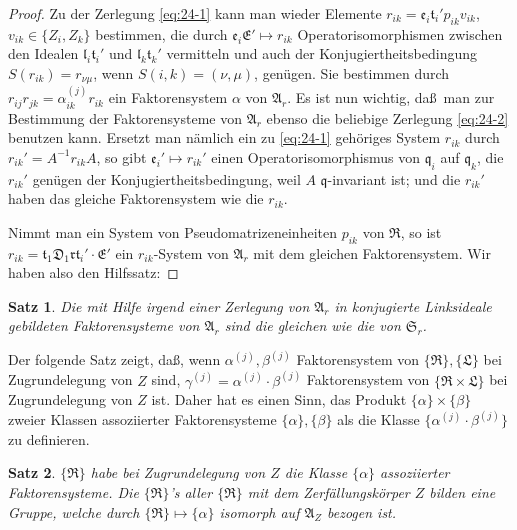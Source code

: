 \documentclass[12pt,a4paper]{article}
\theoremstyle{plain}
\newtheorem{satz}{Satz}[section]
\theoremstyle{definition}
\theoremstyle{remark}
\begin{document}
\begin{proof}
Zu der Zerlegung \eqref{eq:24-1} kann man wieder Elemente
$r_{ik} = \mathfrak{e}_{i}\mathfrak{t}_{i}'p_{ik}v_{ik}$, $v_{ik} \in \{Z_{i}, Z_{k}\}$ bestimmen, die durch
$\mathfrak{e}_{i}\mathfrak{E}' \mapsto r_{ik}$ Operatorisomorphismen zwischen den Idealen
$\mathfrak{l}_{i}\mathfrak{t}_{i}'$ und $\mathfrak{l}_{k}\mathfrak{t}_{k}'$ vermitteln und auch der Konjugiertheitsbedingung
$S(r_{ik}) = r_{\nu\mu}$, wenn $S(i, k) = (\nu, \mu)$, gen\"ugen. Sie bestimmen durch
$r_{ij}r_{jk} = \alpha_{ik}^{(j)}r_{ik}$ ein Faktorensystem $\alpha$ von $\mathfrak{A}_{r}$. Es ist nun
wichtig, da\ss\ man zur Bestimmung der Faktorensysteme von $\mathfrak{A}_{r}$ ebenso die
beliebige Zerlegung \eqref{eq:24-2} benutzen kann. Ersetzt man n\"amlich ein zu
\eqref{eq:24-1} geh\"origes System $r_{ik}$ durch $r_{ik}' = A^{-1}r_{ik}A$, so gibt
$\mathfrak{e}_{i}' \mapsto r_{ik}'$ einen Operatorisomorphismus von $\mathfrak{q}_{i}$ auf $\mathfrak{q}_{k}$, die
$r_{ik}'$ gen\"ugen der Konjugiertheitsbedingung, weil $A$ $\mathfrak{q}$-invariant ist; und die
$r_{ik}'$ haben das gleiche Faktorensystem wie die $r_{ik}$.

Nimmt man ein System von Pseudomatrizeneinheiten $p_{ik}$ von $\mathfrak{R}$, so ist
$r_{ik} = \mathfrak{t}_{1}\mathfrak{D}_{1}\mathfrak{r}\mathfrak{t}_{i}' \cdot \mathfrak{E}'$ ein $r_{ik}$-System von $\mathfrak{A}_{r}$ mit dem gleichen
Faktorensystem. Wir haben also den Hilfssatz:
\end{proof}

\begin{satz}
Die mit Hilfe irgend einer Zerlegung von $\mathfrak{A}_{r}$ in konjugierte Linksideale
gebildeten Faktorensysteme von $\mathfrak{A}_{r}$ sind die gleichen wie die von $\mathfrak{S}_{r}$.
\end{satz}

Der folgende Satz zeigt, da\ss, wenn $\alpha^{(j)}, \beta^{(j)}$ Faktorensystem von
$\{\mathfrak{R}\}, \{\mathfrak{L}\}$ bei Zugrundelegung von $Z$ sind, $\gamma^{(j)} = \alpha^{(j)} \cdot \beta^{(j)}$
Faktorensystem von $\{\mathfrak{R} \times \mathfrak{L}\}$ bei Zugrundelegung von $Z$ ist. Daher hat es
einen Sinn, das Produkt $\{\alpha\} \times \{\beta\}$ zweier Klassen assoziierter
Faktorensysteme $\{\alpha\}, \{\beta\}$ als die Klasse $\{\alpha^{(j)} \cdot \beta^{(j)}\}$ zu definieren.

\begin{satz}\label{satz:24-2}
$\{\mathfrak{R}\}$ habe bei Zugrundelegung von $Z$ die Klasse $\{\alpha\}$ assoziierter
Faktorensysteme. Die $\{\mathfrak{R}\}$'s aller $\{\mathfrak{R}\}$ mit dem Zerf\"allungsk\"orper $Z$
bilden eine Gruppe, welche durch $\{\mathfrak{R}\} \mapsto \{\alpha\}$ isomorph auf
$\mathfrak{A}_{Z}$ bezogen ist.
\end{satz}
\end{document}
